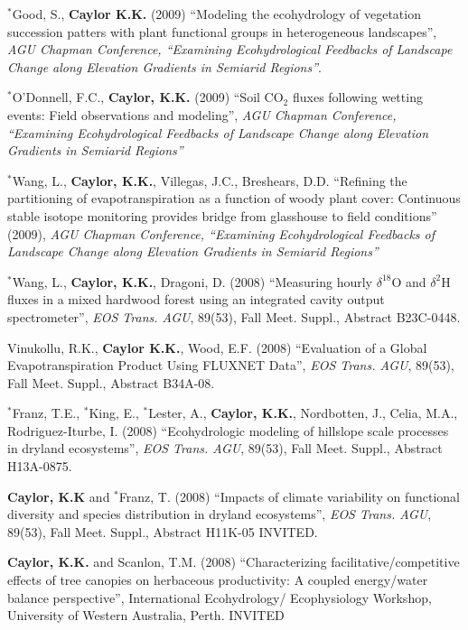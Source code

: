 \documentclass[10pt]{report}
\begin{document}
\begin{etaremune}
\item  $^{*}$Good, S., \textbf{Caylor K.K.} (2009) ``Modeling the ecohydrology of vegetation succession patters with plant functional groups in heterogeneous landscapes'', \emph{AGU Chapman Conference, ``Examining Ecohydrological Feedbacks of Landscape Change along Elevation Gradients in Semiarid Regions''}.

\item  $^{*}$O'Donnell, F.C., \textbf{Caylor, K.K.} (2009) ``Soil CO$_{2}$ fluxes following wetting events: Field observations and modeling'', \emph{AGU Chapman Conference, ``Examining Ecohydrological Feedbacks of Landscape Change along Elevation Gradients in Semiarid Regions''}

\item $^{*}$Wang, L., \textbf{Caylor, K.K.}, Villegas, J.C., Breshears, D.D. ``Refining the partitioning of evapotranspiration as a function of woody plant cover: Continuous stable isotope monitoring provides bridge from glasshouse to field conditions'' (2009), \emph{AGU Chapman Conference, ``Examining Ecohydrological Feedbacks of Landscape Change along Elevation Gradients in Semiarid Regions''}

\item $^{*}$Wang, L., \textbf{Caylor, K.K.}, Dragoni, D. (2008) ``Measuring hourly  $\delta^{18}$O and  $\delta^{2}$H fluxes in a mixed hardwood forest using an integrated cavity output spectrometer'', \emph{EOS Trans. AGU}, 89(53), Fall Meet. Suppl., Abstract B23C-0448.

\item Vinukollu, R.K., \textbf{Caylor K.K.}, Wood, E.F. (2008) ``Evaluation of a Global Evapotranspiration Product Using FLUXNET Data'', \emph{EOS Trans. AGU}, 89(53), Fall Meet. Suppl., Abstract B34A-08.

\item  $^{*}$Franz, T.E., $^{*}$King, E., $^{*}$Lester, A., \textbf{Caylor, K.K.}, Nordbotten, J., Celia, M.A., Rodriguez-Iturbe, I. (2008) ``Ecohydrologic modeling of hillslope scale processes in dryland ecosystems'', \emph{EOS Trans. AGU}, 89(53), Fall Meet. Suppl., Abstract H13A-0875.

\item \textbf{Caylor, K.K} and $^{*}$Franz, T. (2008) ``Impacts of climate variability on functional diversity and species distribution in dryland ecosystems'', \emph{EOS Trans. AGU}, 89(53), Fall Meet. Suppl., Abstract H11K-05 INVITED.

\item \textbf{Caylor, K.K.} and Scanlon, T.M. (2008) ``Characterizing facilitative/competitive effects of tree canopies on herbaceous productivity: A coupled energy/water balance perspective'', International Ecohydrology/ Ecophysiology Workshop, University of Western Australia, Perth.  INVITED


\end{etaremune}
\end{document}
